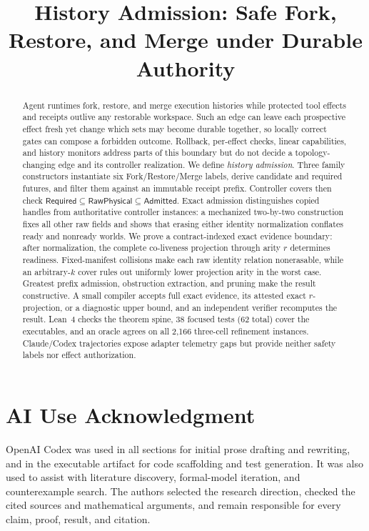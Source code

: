 \documentclass[conference]{IEEEtran}
\title{History Admission: Safe Fork, Restore, and Merge under Durable Authority}
\author{\IEEEauthorblockN{Anonymous Authors}}
\begin{document}
\maketitle

\begin{abstract}
Agent runtimes fork, restore, and merge execution histories while protected
tool effects and receipts outlive any restorable workspace.  Such an edge can
leave each prospective effect fresh yet change which sets may become durable
together, so locally correct gates can compose a forbidden outcome.  Rollback,
per-effect checks, linear capabilities, and history monitors address parts of
this boundary but do not decide a topology-changing edge and its controller
realization.
We define \emph{history admission}.  Three family constructors instantiate six
Fork/Restore/Merge labels, derive candidate and required futures, and
filter them against an immutable receipt prefix.  Controller covers then
check $\mathsf{Required}\subseteq\mathsf{RawPhysical}
\subseteq\mathsf{Admitted}$.  Exact admission distinguishes copied handles
from authoritative controller instances: a mechanized two-by-two construction
fixes all other raw fields and shows that erasing either identity normalization
conflates ready and nonready worlds.
We prove a contract-indexed exact evidence boundary: after normalization, the
complete co-liveness projection through arity $r$ determines readiness.
Fixed-manifest collisions make each raw identity relation nonerasable, while an
arbitrary-$k$ cover rules out uniformly lower projection arity in the worst case.
Greatest prefix admission, obstruction extraction, and pruning make the result
constructive.  A small compiler
accepts full exact evidence, its attested exact $r$-projection, or a diagnostic
upper bound, and an independent verifier recomputes the result.  Lean~4 checks
the theorem spine, 38 focused tests (62 total) cover the executables, and an
oracle agrees on all 2,166 three-cell refinement instances.  Claude/Codex
trajectories expose adapter telemetry gaps but provide neither safety labels
nor effect authorization.
\end{abstract}











\section*{AI Use Acknowledgment}
OpenAI Codex was used in all sections for initial prose drafting and rewriting, and in the executable artifact for code scaffolding and test generation.
It was also used to assist with literature discovery, formal-model iteration, and counterexample search.
The authors selected the research direction, checked the cited sources and mathematical arguments, and remain responsible for every claim, proof, result, and citation.

\appendices




\end{document}
